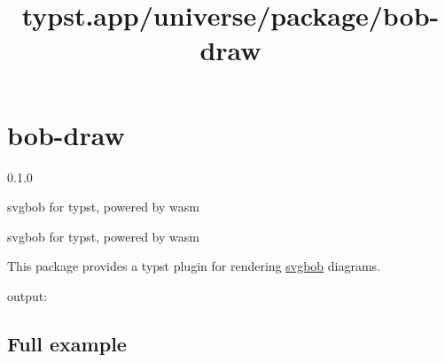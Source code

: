 \title{typst.app/universe/package/bob-draw}

\label{banner}
\section{bob-draw}\label{bob-draw}

{ 0.1.0 }

svgbob for typst, powered by wasm

\label{readme}
svgbob for typst, powered by wasm

This package provides a typst plugin for rendering
\href{https://github.com/ivanceras/svgbob}{svgbob} diagrams.

\begin{Shaded}
\begin{Highlighting}[]
\NormalTok{         /\textbackslash{}\_/\textbackslash{}}
\NormalTok{ (        | |}
\NormalTok{\textasciigrave{}\textasciigrave{}\textasciigrave{})}
\end{Highlighting}
\end{Shaded}

output:

\pandocbounded{}

\subsection{Full example}\label{full-example}

